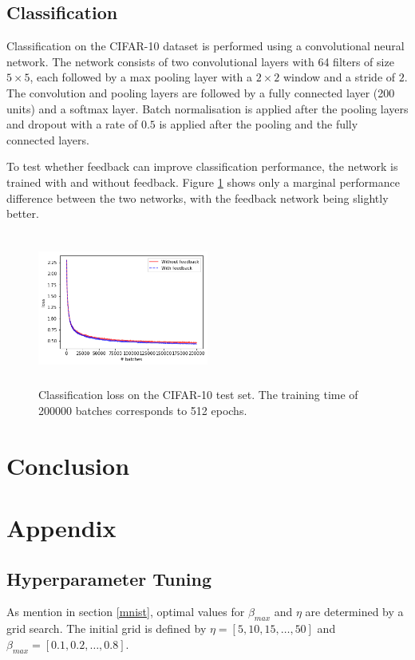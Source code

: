 \documentclass{article}
\begin{document}
\subsection{Classification} 
Classification on the CIFAR-10 dataset is performed using a convolutional neural network. The network consists of two convolutional layers with 64 filters of size $5 \times 5$, each followed by a max pooling layer with a $2\times2$ window and a stride of $2$. The convolution  and pooling layers are followed by a fully connected layer (200 units) and a softmax layer. 
Batch normalisation is applied after the pooling layers and dropout with a rate of $0.5$ is applied after the pooling and the fully connected layers. 

To test whether feedback can improve classification performance, the network is trained with and without feedback. Figure \ref{fig:cifarclass} shows only a marginal performance difference between the two networks, with the feedback network being slightly better. 

\begin{figure}
      \centering
      \includegraphics[width=0.5\textwidth,height=5cm,keepaspectratio]{img/cifar_class_test_loss.png}
      \caption{Classification loss on the CIFAR-10 test set. The training time of 200000 batches corresponds to 512 epochs.}
      \label{fig:cifarclass}
  \end{figure}
  
\section{Conclusion}




\newpage


\section{Appendix}

\subsection{Hyperparameter Tuning} 
As mention in section \ref{mnist}, optimal values for $\beta_{max}$ and $\eta$ are determined by a grid search. The initial grid is defined by $\eta = [5, 10, 15, \dots, 50]$ and $\beta_{max} = [0.1, 0.2, \dots, 0.8]$. 
\end{document}
